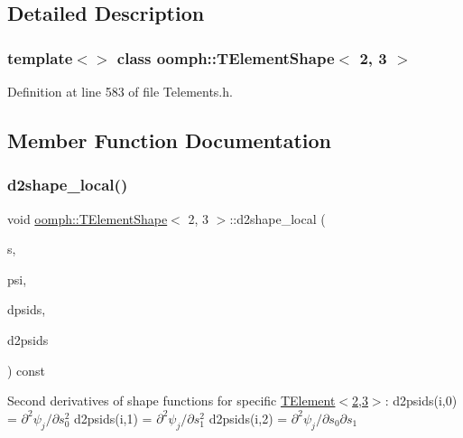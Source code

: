 \subsection{Detailed Description}
\subsubsection*{template$<$$>$\newline
class oomph\+::\+T\+Element\+Shape$<$ 2, 3 $>$}



Definition at line 583 of file Telements.\+h.



\subsection{Member Function Documentation}
\mbox{\label{classoomph_1_1TElementShape_3_012_00_013_01_4_ac44c82a63ade1b5784443d6cf7d72170}} 
\subsubsection{\texorpdfstring{d2shape\+\_\+local()}{d2shape\_local()}}
{\footnotesize\ttfamily void \hyperlink{classoomph_1_1TElementShape}{oomph\+::\+T\+Element\+Shape}$<$ 2, 3 $>$\+::d2shape\+\_\+local (\begin{DoxyParamCaption}\item[{const \hyperlink{classoomph_1_1Vector}{Vector}$<$ double $>$ \&}]{s,  }\item[{\hyperlink{classoomph_1_1Shape}{Shape} \&}]{psi,  }\item[{\hyperlink{classoomph_1_1DShape}{D\+Shape} \&}]{dpsids,  }\item[{\hyperlink{classoomph_1_1DShape}{D\+Shape} \&}]{d2psids }\end{DoxyParamCaption}) const\hspace{0.3cm}{\ttfamily [inline]}}

Second derivatives of shape functions for specific \hyperlink{classoomph_1_1TElement}{T\+Element$<$2,3$>$}\+: d2psids(i,0) = $ \partial^2 \psi_j / \partial s_0^2 $ d2psids(i,1) = $ \partial^2 \psi_j / \partial s_1^2 $ d2psids(i,2) = $ \partial^2 \psi_j / \partial s_0 \partial s_1 $ 

